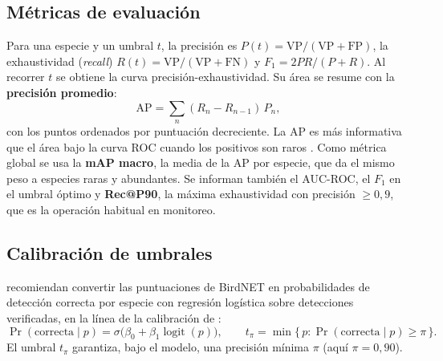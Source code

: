 \documentclass[11pt,a4paper]{article}
\begin{document}
\subsection{Métricas de evaluación}
Para una especie y un umbral $t$, la precisión es $P(t) = \mathrm{VP}/(\mathrm{VP}+\mathrm{FP})$, la exhaustividad (\emph{recall})
$R(t) = \mathrm{VP}/(\mathrm{VP}+\mathrm{FN})$ y $F_1 = 2PR/(P+R)$. Al recorrer $t$ se obtiene la curva precisión-exhaustividad.
Su área se resume con la \textbf{precisión promedio}:
\begin{equation}
  \mathrm{AP} = \sum_{n} (R_n - R_{n-1})\, P_n ,
\end{equation}
con los puntos ordenados por puntuación decreciente. La AP es más informativa que el área bajo la curva ROC cuando los positivos son raros
\citep{davis2006prroc,saito2015prc}. Como métrica global se usa la \textbf{mAP macro}, la media de la AP por especie, que da el mismo peso a especies
raras y abundantes. Se informan también el AUC-ROC, el $F_1$ en el umbral óptimo y \textbf{Rec@P90}, la máxima exhaustividad con precisión
$\geq 0{,}9$, que es la operación habitual en monitoreo.

\subsection{Calibración de umbrales}
\citet{wood2024guidelines} recomiendan convertir las puntuaciones de BirdNET en probabilidades de detección correcta por especie con
regresión logística sobre detecciones verificadas, en la línea de la calibración de \citet{platt1999probabilistic}:
\begin{equation}
  \Pr(\text{correcta} \mid p) = \sigma\big(\beta_0 + \beta_1 \operatorname{logit}(p)\big),
  \qquad t_{\pi} = \min\{\, p : \Pr(\text{correcta}\mid p) \geq \pi \,\}.
\end{equation}
El umbral $t_{\pi}$ garantiza, bajo el modelo, una precisión mínima $\pi$ (aquí $\pi = 0{,}90$).
\end{document}
